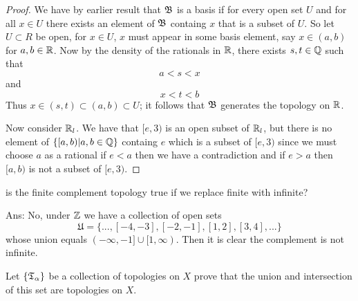 \begin{proof}
    We have by earlier result that $\mathfrak{B}$ is a basis if for every open set $U$ and for all $x \in U$ there exists an element of $\mathfrak{B}$ 
    containg $x$ that is a subset of $U$. So let $U \subset R$ be open, for $x \in U$, $x$ must appear in some basis element, say $x \in (a, b)$ for $a, b \in \mathbb{R}$. Now by the density of the rationals in $\mathbb{R}$, there exists 
    $s, t \in \mathbb{Q}$ such that 
    \[a < s < x\]
    and 
    \[x < t < b\]
    Thus $x \in (s, t) \subset (a, b) \subset U$; it follows that $\mathfrak{B}$ generates the topology on $\mathbb{R}$. 

    Now consider $\mathbb{R}_l$. We have that $[e, 3)$ is an open subset of $\mathbb{R}_l$, but there is no element of $\{[a, b)| a, b \in \mathbb{Q}\}$ containg $e$ which is a subset 
    of $[e, 3)$ since we must choose $a$ as a rational if $e < a$ then we have a contradiction and if $e > a$ then $[a, b)$ is not a subset of $[e, 3)$. 
\end{proof}

\question 
is the finite complement topology true if we replace finite with infinite? 

Ans: No, under $\mathbb{Z}$ we have a collection of open sets 
\[ \mathfrak{U} = \{ ... , [-4, -3], [-2, -1], [1, 2], [3, 4], ... \}\] 
whose union equals $(-\infty, -1] \cup [1, \infty)$. Then it is clear the complement is not infinite. 

\question 
Let $\{\mathfrak{T}_\alpha\}$ be a collection of topologies on $X$ prove that the union and intersection of this set are topologies on $X$. 


